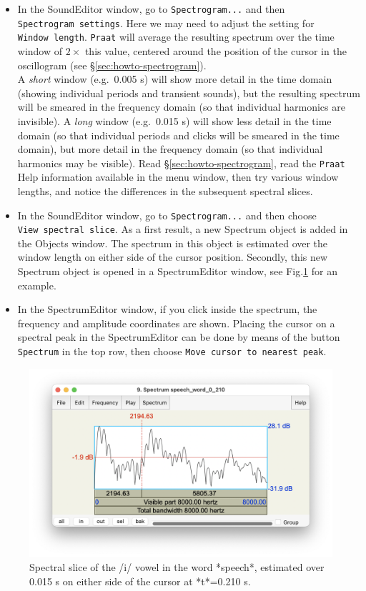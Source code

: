 \documentclass[
]{book}
\begin{document}
\begin{itemize}
\item
  In the SoundEditor window, go to \texttt{Spectrogram...} and then \texttt{Spectrogram\ settings}. Here we may need to adjust the setting for \texttt{Window\ length}. \texttt{Praat} will average the resulting spectrum over the time window of \(2\times\) this value, centered around the position of the cursor in the oscillogram (see §\ref{sec:howto-spectrogram}).\\
  A \emph{short} window (e.g.~0.005 s) will show more detail in the time domain (showing individual periods and transient sounds), but the resulting spectrum will be smeared in the frequency domain (so that individual harmonics are invisible). A \emph{long} window (e.g.~0.015 s) will show less detail in the time domain (so that individual periods and clicks will be smeared in the time domain), but more detail in the frequency domain (so that individual harmonics may be visible). Read §\ref{sec:howto-spectrogram}, read the \texttt{Praat} Help information available in the menu window, then try various window lengths, and notice the differences in the subsequent spectral slices.
\item
  In the SoundEditor window, go to \texttt{Spectrogram...} and then choose \texttt{View\ spectral\ slice}. As a first result, a new Spectrum object is added in the Objects window. The spectrum in this object is estimated over the window length on either side of the cursor position. Secondly, this new Spectrum object is opened in a SpectrumEditor window, see Fig.\ref{fig:speech-spectralslice} for an example.
\item
  In the SpectrumEditor window, if you click inside the spectrum, the frequency and amplitude coordinates are shown. Placing the cursor on a spectral peak in the SpectrumEditor can be done by means of the button \texttt{Spectrum} in the top row, then choose \texttt{Move\ cursor\ to\ nearest\ peak}.
\end{itemize}

\begin{figure}

{\centering \includegraphics{figures/Spectrum_speech_word_0_210} 

}

\caption{Spectral slice of the /i/ vowel in the word *speech*, estimated over 0.015 s on either side of the cursor at *t*=0.210 s. }\label{fig:speech-spectralslice}
\end{figure}
\end{document}
